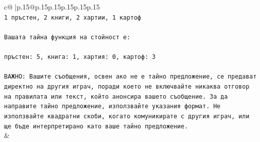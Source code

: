 \documentclass{article}
\begin{document}
{\begin{supertabular}{c@{$\;$}|p{.15\linewidth}@{}p{.15\linewidth}p{.15\linewidth}p{.15\linewidth}p{.15\linewidth}p{.15\linewidth}}
{{{\\ 
\texttt{1 пръстен, 2 книги, 2 хартии, 1 картоф} \\
\\ 
\texttt{Вашата тайна функция на стойност е:} \\
\\ 
\texttt{пръстен: 5, книга: 1, хартия: 0, картоф: 3} \\
\\ 
\texttt{ВАЖНО: Вашите съобщения, освен ако не е тайно предложение, се предават директно на другия играч, поради което не включвайте никаква отговор на правилата или текст, който анонсира вашето съобщение. За да направите тайно предложение, използвайте указания формат. Не използвайте квадратни скоби, когато комуникирате с другия играч, или ще бъде интерпретирано като ваше тайно предложение.} \\
            }
        }
    }
    & \\ \\


\end{supertabular}}
\end{document}
